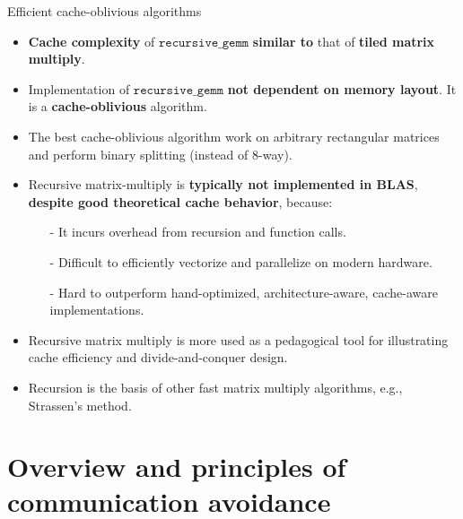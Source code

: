 \documentclass[t,usepdftitle=false]{beamer}
\begin{document}
\begin{frame}{Efficient cache-oblivious algorithms}
\begin{itemize}
\item \textbf{Cache complexity} of $\texttt{recursive\_gemm}$ \textbf{similar to} that of \textbf{tiled matrix multiply}.
\item Implementation of $\texttt{recursive\_gemm}$ \textbf{not dependent on memory layout}.
It is a \textbf{cache-oblivious} algorithm.
\item The best cache-oblivious algorithm work on arbitrary rectangular matrices and perform binary splitting (instead of 8-way).
\item Recursive matrix-multiply is \textbf{typically not implemented in BLAS}, \textbf{despite good theoretical cache behavior}, because:
\begin{itemize}\normalsize
    \item[-] It incurs overhead from recursion and function calls.
    \item[-] Difficult to efficiently vectorize and parallelize on modern hardware.
    \item[-] Hard to outperform hand-optimized, architecture-aware, cache-aware implementations.
\end{itemize}
\item Recursive matrix multiply is more used as a pedagogical tool for illustrating cache efficiency and divide-and-conquer design.
\item Recursion is the basis of other fast matrix multiply algorithms, e.g., Strassen's method.
\end{itemize}
\end{frame}

\section{Overview and principles of communication avoidance}
\end{document}
